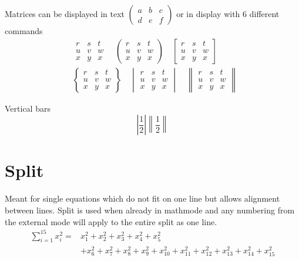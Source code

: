 \noindent
Matrices can be displayed in text \(\left(\begin{smallmatrix} a & b & c \\ d & e & f\end{smallmatrix}\right)\) or in display with 6 different commands
\begin{eqnarray*}
&&\begin{matrix} r & s & t \\ u & v & w \\ x & y & x\end{matrix}\quad
\begin{pmatrix} r & s & t \\ u & v & w \\ x & y & x\end{pmatrix}\quad
\begin{bmatrix} r & s & t \\ u & v & w \\ x & y & x\end{bmatrix}\\
&&\begin{Bmatrix} r & s & t \\ u & v & w \\ x & y & x\end{Bmatrix}\quad
\begin{vmatrix} r & s & t \\ u & v & w \\ x & y & x\end{vmatrix}\quad
\begin{Vmatrix} r & s & t \\ u & v & w \\ x & y & x\end{Vmatrix}\quad
\end{eqnarray*}

\noindent
Vertical bars
\begin{equation}
\left\lvert \frac{1}{2}\right\rvert \left\lVert \frac{1}{2}\right\rVert
\end{equation}



\section[Split]{Split}

Meant for single equations which do not fit on one line but allows alignment between lines. Split is used when already in mathmode and any numbering from the external mode will apply to the entire split as one line.
\begin{equation}\begin{split}\label{split}
\sum_{i=1}^{15} x_i^2 =& x_1^2 + x_2^2 + x_3^2 + x_4^2 + x_5^2 \\
&+ x_6^2 + x_7^2 + x_8^2 + x_9^2 + x_{10}^2+ x_{11}^2 + x_{12}^2 + x_{13}^2 + x_{14}^2 + x_{15}^2
\end{split}\end{equation}

